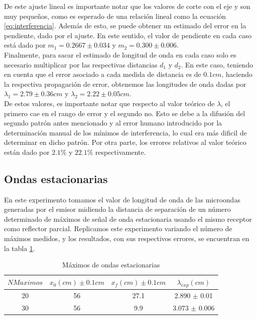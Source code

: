 \documentclass[%
 reprint,
 amsmath,amssymb,
 aps,
]{revtex4-1}
\begin{document}
De este ajuste lineal es importante notar que los valores de corte con el eje y son muy pequeños, como es esperado de una relación lineal como la ecuación \ref{eq:interferencia}. Además de esto, se puede obtener un estimado del error en la pendiente, dado por el ajuste. En este sentido, el valor de pendiente  en cada caso está dado por $m_1 = 0.2667 \pm 0.034$ y $m_2 = 0.300 \pm 0.006$. \\

Finalmente, para sacar el estimado de longitud de onda en cada caso solo es necesario multiplicar por las respectivas distancias $d_1$ y $d_2$. En este caso, teniendo en cuenta que el error asociado a cada medida de distancia es de $0.1cm$, haciendo la respectiva propagación de error, obtenemos las longitudes de onda dadas por $\lambda_1 = 2.79 \pm 0.36cm$ y $\lambda_2 = 2.22 \pm 0.05cm$.\\

De estos valores, es importante notar que respecto al valor teórico de $\lambda$, el primero cae en el rango de error y el segundo no. Esto se debe a la difusión del segundo patrón antes mencionado y al error humano introducido por la determinación manual de los mínimos de interferencia, lo cual era más dificil de determinar en dicho patrón. Por otra parte, los errores relativos al valor teórico están dado por $2.1\%$ y $22.1\%$ respectivamente.\\

\subsection{\label{sec:level2}Ondas estacionarias}
En este experimento tomamos el valor de longitud de onda de las microondas generadas por el emisor midiendo la distancia de separación de un número determinado de máximos de señal de onda estacionaria usando el mismo receptor como reflector parcial. Replicamos este experimento variando el número de máximos medidos, y los resultados, con sus respectivos errores, se encuentran en la tabla \ref{table:estacionaria}.\\

\begin{table}[h!]
\centering
 \begin{tabular}{|c|c|c|c|} 
 \hline
 $N Maximos$& $x_0(cm) \pm 0.1cm$ & $x_f(cm) \pm 0.1cm$ & $\lambda_{exp} (cm)$ \\ [0.5ex] 
 \hline\hline
 20 & 56 & 27.1 & 2.890 $\pm$ 0.01\\
 30 & 56 & 9.9 & 3.073 $\pm$ 0.006\\
[1ex] 
 \hline
 \end{tabular}
 \caption{Máximos de ondas estacionarias}
 \label{table:estacionaria}
\end{table}
\end{document}
